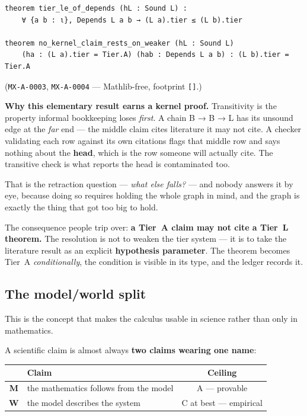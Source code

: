 \documentclass[11pt,a4paper]{article}
\begin{document}
\begin{lstlisting}[language=Lean]
theorem tier_le_of_depends (hL : Sound L) :
    ∀ {a b : ι}, Depends L a b → (L a).tier ≤ (L b).tier

theorem no_kernel_claim_rests_on_weaker (hL : Sound L)
    (ha : (L a).tier = Tier.A) (hab : Depends L a b) : (L b).tier = Tier.A
\end{lstlisting}

\noindent(\texttt{MX-A-0003}, \texttt{MX-A-0004} — Mathlib-free, footprint \texttt{[]}.)

\textbf{Why this elementary result earns a kernel proof.} Transitivity is the property informal
bookkeeping loses \emph{first}. A chain \textsf{B} → \textsf{B} → \textsf{L} has its unsound
edge at the \emph{far} end — the middle claim cites literature it may not cite. A checker
validating each row against its own citations flags that middle row and says nothing about the
\textbf{head}, which is the row someone will actually cite. The transitive check is what reports
the head is contaminated too.

That is the retraction question — \emph{what else falls?} — and nobody answers it by eye, because
doing so requires holding the whole graph in mind, and the graph is exactly the thing that got too
big to hold.

The consequence people trip over: \textbf{a Tier~A claim may not cite a Tier~L theorem.} The
resolution is not to weaken the tier system — it is to take the literature result as an explicit
\textbf{hypothesis parameter}. The theorem becomes Tier~A \emph{conditionally}, the condition is
visible in its type, and the ledger records it.

\subsection{The model/world split}

This is the concept that makes the calculus usable in science rather than only in mathematics.

A scientific claim is almost always \textbf{two claims wearing one name}:

\begin{center}\small
\begin{tabular}{@{}clc@{}}
\toprule
 & Claim & Ceiling \\
\midrule
\textbf{M} & the mathematics follows from the model & \textsf{A} — provable \\
\textbf{W} & the model describes the system         & \textsf{C} at best — empirical \\
\bottomrule
\end{tabular}
\end{center}
\end{document}
